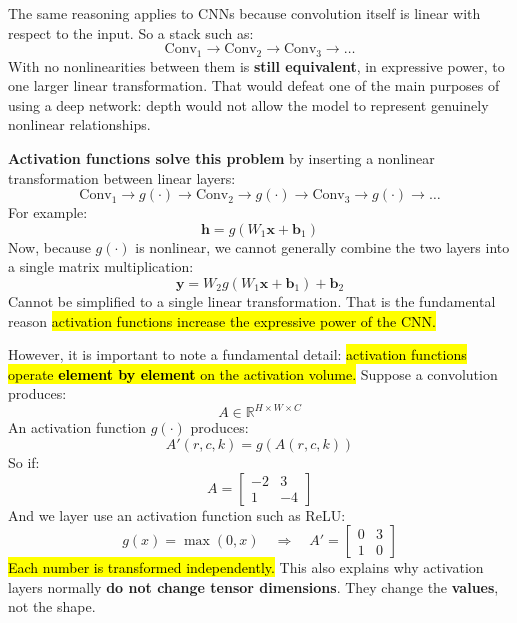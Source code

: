 \highspace
The same reasoning applies to CNNs because convolution itself is linear with respect to the input. So a stack such as:
\begin{equation*}
    \text{Conv}_{1} \rightarrow \text{Conv}_2 \rightarrow \text{Conv}_3 \rightarrow \dots
\end{equation*}
With no nonlinearities between them is \textbf{still equivalent}, in expressive power, to one larger linear transformation. That would defeat one of the main purposes of using a deep network: depth would not allow the model to represent genuinely nonlinear relationships.

\highspace
\textcolor{Green3}{} \textbf{Activation functions solve this problem} by inserting a nonlinear transformation between linear layers:
\begin{equation*}
    \text{Conv}_{1} \rightarrow g(\cdot) \rightarrow \text{Conv}_2 \rightarrow g(\cdot) \rightarrow \text{Conv}_3 \rightarrow g(\cdot) \rightarrow \dots
\end{equation*}
For example:
\begin{equation*}
    \mathbf{h} = g\left(W_1 \mathbf{x} + \mathbf{b}_1\right)
\end{equation*}
Now, because $g(\cdot)$ is nonlinear, we cannot generally combine the two layers into a single matrix multiplication:
\begin{equation*}
    \mathbf{y} = W_2 g\left(W_1 \mathbf{x} + \mathbf{b}_1\right) + \mathbf{b}_2
\end{equation*}
Cannot be simplified to a single linear transformation. That is the fundamental reason \hl{activation functions increase the expressive power of the CNN.}

\highspace
However, it is important to note a fundamental detail: \hl{activation functions operate \textbf{element by element} on the activation volume.} Suppose a convolution produces:
\begin{equation*}
    A \in \mathbb{R}^{H \times W \times C}
\end{equation*}
An activation function $g(\cdot)$ produces:
\begin{equation*}
    A'(r, c, k) = g\left(A(r, c, k)\right)
\end{equation*}
So if:
\begin{equation*}
    A = \begin{bmatrix}
        -2 & 3 \\
        1 & -4
    \end{bmatrix}
\end{equation*}
And we layer use an activation function such as ReLU:
\begin{equation*}
    g(x) = \max(0, x) \quad \Rightarrow \quad A' = \begin{bmatrix}
        0 & 3 \\
        1 & 0
    \end{bmatrix}
\end{equation*}
\hl{Each number is transformed independently.} This also explains why activation layers normally \textbf{do not change tensor dimensions}. They change the \textbf{values}, not the shape.

